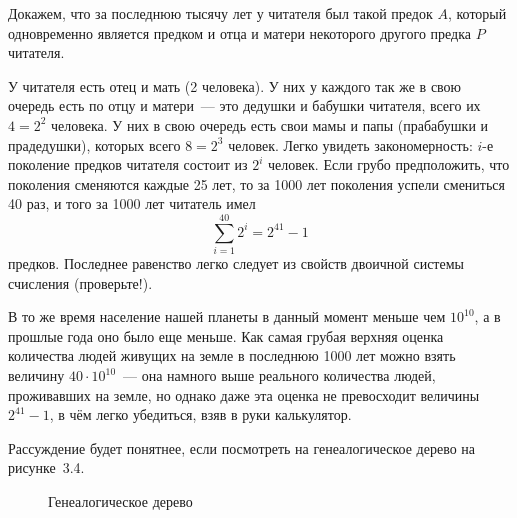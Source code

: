 \begin{example}
Докажем, что за последнюю тысячу лет у читателя был такой предок $A$, который одновременно является предком и отца и матери некоторого другого предка $P$ читателя.

У читателя есть отец и мать (2 человека). У них у каждого так же в свою очередь есть по отцу и матери~--- это дедушки и бабушки читателя, всего их $4=2^2$ человека. У них в свою очередь есть свои мамы и папы (прабабушки и прадедушки), которых всего $8=2^3$ человек. Легко увидеть закономерность: $i$-е поколение предков читателя состоит из $2^i$ человек. Если грубо предположить, что поколения сменяются каждые 25 лет, то за 1000 лет поколения успели смениться 40 раз, и того за 1000 лет читатель имел
$$\sum_{i=1}^{40} 2^i = 2^{41} - 1$$
предков. Последнее равенство легко следует из свойств двоичной системы счисления (проверьте!).

В то же время население нашей планеты в данный момент меньше чем $10^{10}$, а в прошлые года оно было еще меньше. Как самая грубая верхняя оценка количества людей живущих на земле в последнюю 1000 лет можно взять величину $40\cdot 10^{10}$~--- она намного выше реального количества людей, проживавших на земле, но однако даже эта оценка не превосходит величины $2^{41} - 1$, в чём легко убедиться, взяв в руки калькулятор.

Рассуждение будет понятнее, если посмотреть на генеалогическое дерево на рисунке~3.4.

\begin{figure}[h]
\centering
{}
\caption{Генеалогическое дерево}
\end{figure}


\end{example}
